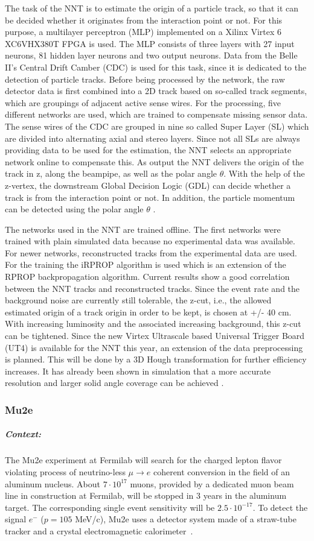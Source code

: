 The task of the NNT is to estimate the origin of a particle track, so that it can be decided whether it originates from the interaction point or not. For this purpose, a multilayer perceptron (MLP) implemented on a Xilinx Virtex 6 XC6VHX380T FPGA is used. The MLP consists of three layers with 27 input neurons, 81 hidden layer neurons and two output neurons. Data from the Belle II's Central Drift Camber (CDC) is used for this task, since it is dedicated to the detection of particle tracks. Before being processed by the network, the raw detector data is first combined into a 2D track based on so-called track segments, which are groupings of adjacent active sense wires. For the processing, five different networks are used, which are trained to compensate missing sensor data. The sense wires of the CDC are grouped in nine so called Super Layer (SL) which are divided into alternating axial and stereo layers. Since not all SLs are always providing data to be used for the estimation, the NNT selects an appropriate network online to compensate this. As output the NNT delivers the origin of the track in z, along the beampipe, as well as the polar angle $\theta$. With the help of the z-vertex, the downstream Global Decision Logic (GDL) can decide whether a track is from the interaction point or not. In addition, the particle momentum can be detected using the polar angle $\theta$ \cite{baehr2019low}. 

The networks used in the NNT are trained offline. The first networks were trained with plain simulated data because no experimental data was available. For newer networks, reconstructed tracks from the experimental data are used. For the training the iRPROP algorithm is used which is an extension of the RPROP backpropagation algorithm. Current results show a good correlation between the NNT tracks and reconstructed tracks. Since the event rate and the background noise are currently still tolerable, the z-cut, i.e., the allowed estimated origin of a track origin in order to be kept, is chosen at +/- 40 cm. With increasing luminosity and the associated increasing background, this z-cut can be tightened. Since the new Virtex Ultrascale based Universal Trigger Board (UT4) is available for the NNT this year, an extension of the data preprocessing is planned. This will be done by a 3D Hough transformation for further efficiency increases. It has already been shown in simulation that a more accurate resolution and larger solid angle coverage can be achieved \cite{Skambraks_2020}.

\subsubsection{Mu2e}
\subparagraph*{Context:} The Mu2e experiment at Fermilab will search for the charged lepton flavor violating process of neutrino-less $\mu \to e$ coherent conversion in the field of an aluminum nucleus. About $7\cdot 10^{17}$ muons, provided by a dedicated muon beam line in construction at Fermilab, will be stopped in 3 years in the aluminum target. The corresponding single event sensitivity will be $2.5\cdot 10^{-17}$. To detect the signal $e^-$ ($p=105$ MeV/c), Mu2e uses a detector system made of a straw-tube tracker and a crystal electromagnetic calorimeter~\cite{MU2E}. 

